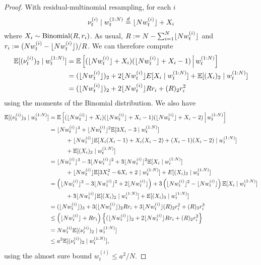 \begin{proof}
With residual-multinomial resampling, for each $i$
\begin{equation*}
\nu_t^{(i)} \mid w_t^{(1:N)}
\overset{d}{=} \lfloor N w_t^{(i)} \rfloor + X_i
\end{equation*}
where $X_i \sim \operatorname{Binomial}(R, r_i)$. As usual, $R := N - \sum_{i=1}^N \lfloor N w_t^{(i)} \rfloor$ and $r_i := ( Nw_t^{(i)} - \lfloor N w_t^{(i)} \rfloor ) /R$.
We can therefore compute
\begin{align*}
\mathbb{E} [ (\nu_t^{(i)})_2 \mid w_t^{(1:N)} ]
&= \mathbb{E}\left[ (\lfloor N w_t^{(i)} \rfloor + X_i) (\lfloor N w_t^{(i)} \rfloor + X_i -1) \,\middle|\, w_t^{(1:N)} \right] \\
&= (\lfloor N w_t^{(i)} \rfloor)_2 + 2\lfloor N w_t^{(i)} \rfloor E[ X_i \mid w_t^{(1:N)} ] + \mathbb{E}[ (X_i)_2 \mid w_t^{(1:N)} ] \\
&= (\lfloor N w_t^{(i)} \rfloor)_2 + 2\lfloor N w_t^{(i)} \rfloor R r_i + (R)_2 r_i^2
\end{align*}
using the moments of the Binomial distribution.
We also have
\begin{align*}
\mathbb{E} [ (\nu_t^{(i)})_3 \mid w_t^{(1:N)} ]
&= \mathbb{E}\left[ (\lfloor N w_t^{(i)} \rfloor + X_i) (\lfloor N w_t^{(i)} \rfloor + X_i -1) (\lfloor N w_t^{(i)} \rfloor + X_i -2) \,\middle|\, w_t^{(1:N)} \right] \\
&= \lfloor N w_t^{(i)} \rfloor^3 + \lfloor N w_t^{(i)} \rfloor^2 \mathbb{E}[ 3X_i -3 \mid w_t^{(1:N)} ] \\
    &\hspace{1cm}+ \lfloor N w_t^{(i)} \rfloor 
        \mathbb{E}[ X_i(X_i-1) + X_i(X_i-2) + (X_i-1)(X_i-2) \mid w_t^{(1:N)} ] \\
    &\hspace{1cm}+ \mathbb{E}[ (X_i)_3 \mid w_t^{(1:N)} ] \\
&= \lfloor N w_t^{(i)} \rfloor^3 - 3\lfloor N w_t^{(i)} \rfloor^2 +3\lfloor N w_t^{(i)} \rfloor^2 \mathbb{E}[ X_i \mid w_t^{(1:N)} ] \\
    &\hspace{1cm}+ \lfloor N w_t^{(i)} \rfloor \mathbb{E}[ 3X_i^2 - 6X_i +2 \mid w_t^{(1:N)} ] 
        + E[(X_i)_3 \mid w_t^{(1:N)} ]\\
&= \left( \lfloor N w_t^{(i)} \rfloor^3 - 3\lfloor N w_t^{(i)} \rfloor^2 + 2\lfloor N w_t^{(i)} \rfloor \right)
        + 3 \left( \lfloor N w_t^{(i)} \rfloor^2 - \lfloor N w_t^{(i)} \rfloor \right) \mathbb{E}[ X_i \mid w_t^{(1:N)} ] \\
    &\hspace{1cm}+ 3 \lfloor N w_t^{(i)} \rfloor \mathbb{E}[ (X_i)_2 \mid w_t^{(1:N)} ] 
        + \mathbb{E}[ (X_i)_3 \mid w_t^{(1:N)} ] \\
&= (\lfloor N w_t^{(i)} \rfloor)_3 + 3(\lfloor N w_t^{(i)} \rfloor)_2 R r_i + 3\lfloor N w_t^{(i)} \rfloor (R)_2 r_i^2 + (R)_3 r_i^3 \\
&\leq \left( \lfloor N w_t^{(i)} \rfloor + R r_i \right) \left\{ (\lfloor N w_t^{(i)} \rfloor)_2 + 2\lfloor N w_t^{(i)} \rfloor R r_i 
        + (R)_2 r_i^2 \right\} \\
&= Nw_t^{(i)} \mathbb{E}[(\nu_t^{(i)})_2 \mid w_t^{(1:N)} ] \\
&\leq a^2 \mathbb{E}[(\nu_t^{(i)})_2 \mid w_t^{(1:N)} ] ,
\end{align*}
using the almost sure bound $w_t^{(i)} \leq a^2/N$.


\end{proof}
